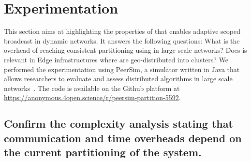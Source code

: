 
\section{Experimentation}
\label{sec:experimentation}

This section aims at highlighting the properties of \NAME that enables
adaptive scoped broadcast in dynamic networks. It answers the
following questions: What is the overhead of reaching consistent
partitioning using \NAME in large scale networks? Does \NAME is
relevant in Edge infrastructures where \processes are geo-distributed
into clusters? We performed the experimentation using PeerSim, a
simulator written in Java that allows researchers to evaluate and
assess distributed algorithms in large scale
networks~\cite{montresor2009peersim}. The code is available on the
Github platform at
\url{https://anonymous.4open.science/r/peersim-partition-5592}.

\subsection{Confirm the complexity analysis stating that
  communication and time overheads depend on the current partitioning
  of the system.}

